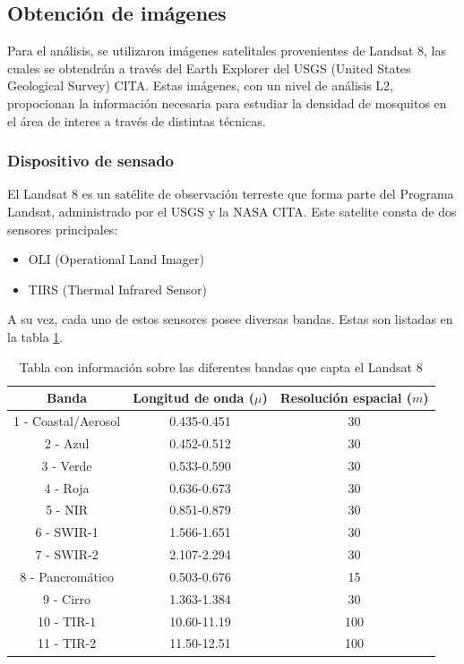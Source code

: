 

\subsection{Obtención de imágenes}

Para el análisis, se utilizaron imágenes satelitales provenientes de Landsat 8, las cuales se obtendrán a través del Earth Explorer del USGS (United States Geological Survey) CITA. Estas imágenes, con un nivel de análisis L2, propocionan la información necesaria para estudiar la densidad de mosquitos en el área de interes a través de distintas técnicas.

\subsubsection{Dispositivo de sensado}

El Landsat 8 es un satélite de observación terreste que forma parte del Programa Landsat, administrado por el USGS y la NASA CITA. Este satelite consta de dos sensores principales:
\begin{itemize}
	\item OLI (Operational Land Imager)
	\item TIRS (Thermal Infrared Sensor)
\end{itemize}

A su vez, cada uno de estos sensores posee diversas bandas. Estas son listadas en la tabla \ref{table:landsat}.
\onehalfspacing

\begin{table}[H]
\begin{center}
	\begin{tabular}{|c | c | c|} 
		\hline
		\textbf{Banda} & \textbf{Longitud de onda ($\mu$)} & \textbf{Resolución espacial ($m$)}\\
		\hline
		1 - Coastal/Aerosol & 0.435-0.451 & 30 \\
		\hline
		2 - Azul & 0.452-0.512 & 30 \\
		\hline
		3 - Verde& 0.533-0.590 & 30 \\
		\hline
		4 - Roja & 0.636-0.673 & 30 \\
		\hline
		5 - NIR & 0.851-0.879 & 30 \\
		\hline
		6 - SWIR-1 & 1.566-1.651 & 30 \\
		\hline
		7 - SWIR-2 & 2.107-2.294 & 30 \\
		\hline
		8 - Pancromático & 0.503-0.676 & 15 \\
		\hline
		9 - Cirro & 1.363-1.384 & 30 \\
		\hline
		10 - TIR-1 & 10.60-11.19 & 100 \\
		\hline
		11 - TIR-2 & 11.50-12.51 & 100 \\
		\hline
	\end{tabular}
\end{center}
\caption{Tabla con información sobre las diferentes bandas que capta el Landsat 8}
\label{table:landsat}
\end{table}
\singlespacing

